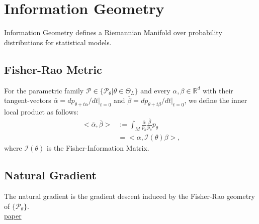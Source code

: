 \section{Information Geometry}
Information Geometry defines a Riemannian Manifold over probability distributions for statistical models.\\
\subsection{Fisher-Rao Metric}
For the parametric family $\mathcal{P} \in \{ \mathcal{P}_\theta | \theta \in \Theta_L\}$ and every $\alpha, \beta \in \mathbb{R}^d$ with their tangent-vectors $\bar{\alpha}=dp_{\theta + t\alpha}/dt|_{t=0}$ and $\bar{\beta}=dp_{\theta + t\beta}/dt|_{t=0}$, we define the inner local product as follows:
\begin{align*}
	<\bar{\alpha}, \bar{\beta}> &:= \int_M\frac{\bar{\alpha}}{p_\theta}\frac{\bar{\beta}}{p_\theta}p_\theta\\
	&=<\alpha, \mathcal{I}(\theta)\beta>\text{,}
\end{align*}
where $\mathcal{I}(\theta)$ is the Fisher-Information Matrix.
\subsection{Natural Gradient}
The natural gradient is the gradient descent induced by the Fisher-Rao geometry of $\{\mathcal{P}_\theta \}$.\\
\href{https://arxiv.org/abs/1711.01530}{paper}